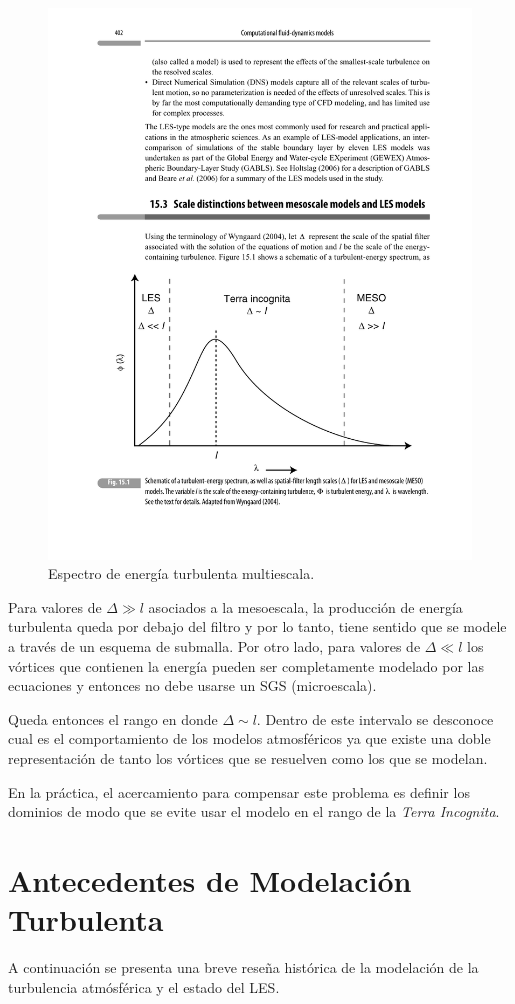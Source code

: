 \begin{figure}[H]
	\centering
	\includegraphics[width=0.69\linewidth,trim={2cm 3.0cm 1.5cm 11.5cm},clip]{Imagenes/02/terra_inc}
	\caption{Espectro de energía turbulenta multiescala.}
	\label{fig:02_terra_inc}
\end{figure}

Para valores de $\Delta\gg l$ asociados a la mesoescala, la producción de energía turbulenta queda por debajo del filtro y por lo tanto, tiene sentido que se modele a través de un esquema de submalla. Por otro lado, para valores de $\Delta\ll l$ los vórtices que contienen la energía pueden ser completamente modelado por las ecuaciones y entonces no debe usarse un SGS (microescala).

Queda entonces el rango en donde $\Delta\sim l$. Dentro de este intervalo se desconoce cual es el comportamiento de los modelos atmosféricos ya que existe una doble representación de tanto los vórtices que se resuelven como los que se modelan.

En la práctica, el acercamiento para compensar este problema es definir los dominios de modo que se evite usar el modelo en el rango de la \emph{Terra Incognita}.

\newpage
\section{Antecedentes de Modelación Turbulenta}
A continuación se presenta una breve reseña histórica de la modelación de la turbulencia atmósférica y el estado del LES.


